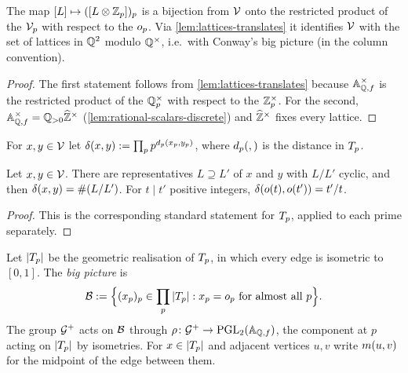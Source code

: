 \begin{lemma}
\label{lem:restricted-product}
The map $[L] \mapsto ([L\otimes\mathbb{Z}_{p}])_p$
is a bijection from $\mathcal{V}$ onto the restricted product of
the $\mathcal{V}_{p}$ with respect to the $o_{p}$. Via
\cref{lem:lattices-translates} it identifies $\mathcal{V}$ with the
set of lattices in $\mathbb{Q}^{2}$ modulo $\mathbb{Q}^{\times}$, i.e.\ with Conway's big
picture (in the column convention).
\end{lemma}

\begin{proof}
The first statement follows from \cref{lem:lattices-translates} because
$\mathbb{A}_{\mathbb{Q},f}^{\times}$ is the restricted product of the
$\mathbb{Q}_{p}^{\times}$ with respect to the $\mathbb{Z}_{p}^{\times}$. For
the second, $\mathbb{A}_{\mathbb{Q},f}^{\times} = \mathbb{Q}_{>0}\widehat{\mathbb{Z}}^{\times}$
(\cref{lem:rational-scalars-discrete}) and $\widehat{\mathbb{Z}}^{\times}$ fixes
every lattice.
\end{proof}

\begin{definition}[Hyperdistance]\label{def:hyperdistance}
For $x, y \in \mathcal{V}$ let
$\delta(x,y) := \prod_p p^{d_{p}(x_p,y_p)}$, where
$d_{p}(,)$ is the distance in $T_{p}$.
\end{definition}

\begin{lemma}\label{lem:hyperdistance-index}
Let $x, y \in \mathcal{V}$. There are representatives $L \supseteq L'$
of $x$ and $y$ with $L/L'$ cyclic, and then
$\delta(x,y) = \#(L/L')$. For $t \mid t'$ positive integers,
$\delta(o(t),o(t')) = t'/t$.
\end{lemma}

\begin{proof}
This is the corresponding standard statement for $T_{p}$, applied to
each prime separately.
\end{proof}

\begin{definition}\label{def:big-picture}
Let $|T_{p}|$ be the geometric realisation of $T_{p}$, in
which every edge is isometric to $[0,1]$. The \emph{big picture} is
\[
  \mathcal{B} := \Bigl\{ (x_p)_p \in \prod_p |T_{p}| :
  x_p = o_{p} \text{ for almost all } p \Bigr\} .
\]
The group $\mathcal{G}^{+}$ acts on $\mathcal{B}$ through
$\ProjectionToPGL \colon \AdelicGroup \to \PGL{2}{\FiniteAdeles{\QQ}}$, the
component at $p$ acting on $|T_{p}|$ by isometries. For
$x \in |T_{p}|$ and adjacent vertices $u, v$ write
$m(u,v)$ for the midpoint of the edge between them.
\end{definition}

